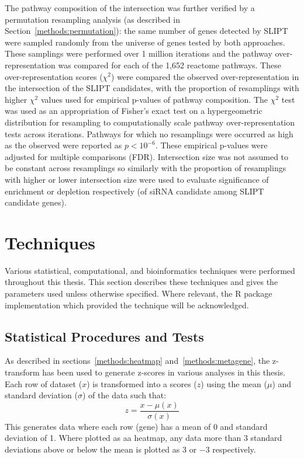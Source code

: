 The pathway composition of the intersection was further verified by a permutation resampling analysis (as described in Section~\ref{methods:permutation}): the same number of genes detected by \gls{SLIPT} were sampled randomly from the universe of genes tested by both approaches. These samplings were performed over 1 million iterations and the pathway over-representation was compared for each of the 1,652 reactome pathways.
These over-representation scores ($\chi^2$) were compared the observed over-representation in the intersection of the \gls{SLIPT} candidates, with the proportion of resamplings with higher $\chi^2$ values used for empirical p-values of pathway composition. The $\chi^2$ test was used as an appropriation of Fisher's exact test on a hypergeometric distribution for resampling to computationally scale pathway over-representation tests across iterations.  Pathways for which no resamplings were occurred as high as the observed were reported as $p < 10^{-6}$. These empirical p-values were adjusted for multiple comparisons (FDR). Intersection size was not assumed to be constant across resamplings so similarly with the proportion of resamplings with higher or lower intersection size were used to evaluate significance of enrichment or depletion respectively (of \gls{siRNA} candidate among \gls{SLIPT} candidate genes).  

\section{Techniques}
Various statistical, computational, and bioinformatics techniques were performed throughout this thesis. This section describes these techniques and gives the parameters used unless otherwise specified. Where relevant, the R package implementation which provided the technique will be acknowledged. 

\subsection{Statistical Procedures and Tests}

As described in sections~\ref{methods:heatmap} and~\ref{methods:metagene}, the z-transform has been used to generate z-scores in various analyses in this thesis. Each row of dataset ($x$) is transformed into a scores ($z$) using the mean ($\mu$) and standard deviation ($\sigma$) of the data such that: $$ z = \frac{x - \mu(x)}{\sigma(x)} $$
This generates data where each row (gene) has a mean of 0 and standard deviation of 1. Where plotted as aa heatmap, any data more than 3 standard deviations above or below the mean is plotted as $3$ or $-3$ respectively.

